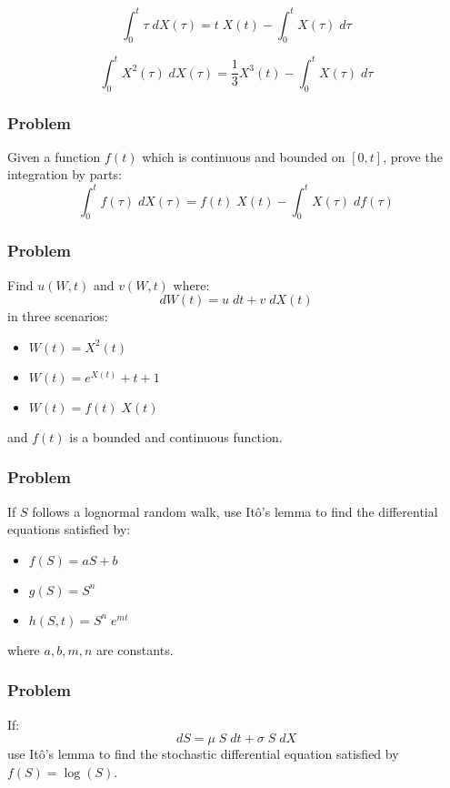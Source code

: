 \begin{equation}
    \int_0^t \tau \; dX(\tau) = t \; X(t) - \int_0^t X(\tau) \; d\tau
    \nonumber
\end{equation}

\begin{equation}
    \int_0^t X^2(\tau) \; dX(\tau) = \frac{1}{3} X^3(t) - \int_0^t X(\tau) \; d\tau
    \nonumber
\end{equation}


\subsubsection{Problem}
Given a function $f(t)$ which is continuous and bounded on $[0,t]$, prove the integration by parts:
\begin{equation}
    \int_0^t f(\tau) \; dX(\tau) = f(t) \; X(t) - \int_0^t X(\tau) \; df(\tau)
\end{equation}


\subsubsection{Problem}
Find $u(W,t)$ and $v(W,t)$ where:
\begin{equation}
    dW(t) = u \; dt + v \; dX(t)
    \nonumber
\end{equation}
in three scenarios:
\begin{itemize}
    \setlength\itemsep{0em}
    \item $W(t) = X^2(t)$
    \item $W(t) = e^{X(t)} + t + 1$
    \item $W(t) = f(t) \; X(t)$
\end{itemize} 
and $f(t)$ is a bounded and continuous function.


\subsubsection{Problem}
If $S$ follows a lognormal random walk, use Itô's lemma to find the differential equations satisfied by:
\begin{itemize}
    \setlength\itemsep{0em}
    \item $f(S) = aS + b$
    \item $g(S) = S^n$
    \item $h(S,t) = S^n \; e^{mt}$
\end{itemize} 
where $a, b, m, n$ are constants.


\subsubsection{Problem}
If:
\begin{equation}
    dS = \mu \; S \; dt + \sigma \; S \; dX
    \nonumber
\end{equation}
use Itô's lemma to find the stochastic differential equation satisfied by $f(S) = \log(S)$.


